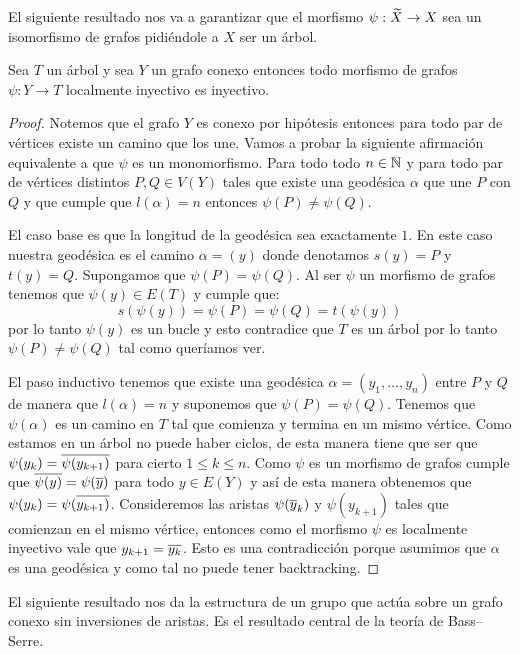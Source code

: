 \documentclass[tesis.tex]{subfiles}
\begin{document}
El siguiente resultado nos va a garantizar que el morfismo $\psi: \widetilde X \to X$ sea un isomorfismo de grafos pidiéndole a $X$ ser un árbol.

\begin{prop}\label{prop_loc_iny}
	Sea $T$ un árbol y sea $Y$ un grafo conexo entonces todo morfismo de grafos $\psi:Y \to T$ localmente inyectivo es inyectivo.    
\end{prop}
\begin{proof}
	Notemos que el grafo $Y$ es conexo por hipótesis entonces para todo par de vértices existe un camino que los une.
	Vamos a probar la siguiente afirmación equivalente a que $\psi$ es un monomorfismo. 
	Para todo todo $n \in \mathbb{N}$ y para todo par de vértices distintos $P,Q \in V(Y)$  tales que existe una geodésica $\alpha$ que une $P$ con $Q$ y que cumple que $l(\alpha) = n$ entonces  $\psi(P) \neq \psi(Q)$.	
		
	
	El caso base es que la longitud de la geodésica sea exactamente $1$.
	En este caso nuestra geodésica es el camino $\alpha = (y)$ donde denotamos $s(y)= P$ y $t(y) = Q$.
	Supongamos que $\psi(P) = \psi(Q)$. 
	Al ser $\psi$ un morfismo de grafos tenemos que $\psi(y) \in E(T)$ y cumple que: 
	\begin{equation*}
		s(\psi(y)) = \psi(P) = \psi(Q) = t(\psi(y))
	\end{equation*}
	por lo tanto $\psi(y)$ es un bucle y esto contradice que $T$ es un árbol por lo tanto $\psi(P) \neq \psi(Q)$ tal como queríamos ver.
	
	
	El paso inductivo tenemos que existe una geodésica $\alpha= (y_1, \dots, y_n)$ entre $P$ y $Q$ de manera que $l(\alpha) = n$ y suponemos que $\psi(P) = \psi(Q)$.
	Tenemos que $\psi(\alpha)$ es un camino en $T$ tal que comienza y termina en un mismo vértice.
	Como estamos en un árbol no puede haber ciclos, de esta manera tiene que ser que $\psi(y_k) = \overline{\psi (y_{k+1})}$ para cierto $1 \le k \le n$.
	Como $\psi$ es un morfismo de grafos cumple que $\overline {\psi(y)} = \psi(\overline y)$ para todo $y \in E(Y)$ y así de esta manera obtenemos que $\psi(y_k) =  \psi(\overline{y_{k+1})}$.
	Consideremos las aristas $\psi(\overline y_{k})$ y $\psi(y_{k+1})$ tales que comienzan en el mismo vértice, entonces como el morfismo $\psi$ es localmente inyectivo vale que $y_{k+1} = \overline{y_k}$. 
	Esto es una contradicción porque asumimos que $\alpha$ es una geodésica y como tal no puede tener backtracking.    
	
\end{proof}

El siguiente resultado nos da la estructura de un grupo que actúa sobre un grafo conexo sin inversiones de aristas. 
Es el resultado central de la teoría de Bass--Serre.
\end{document}
